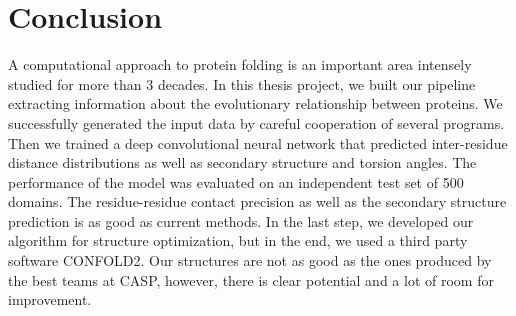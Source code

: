 \chapter*{Conclusion}

A computational approach to protein folding is an important area intensely studied for more than 3 decades. In this thesis project, we built our pipeline extracting information about the evolutionary relationship between proteins. We successfully generated the input data by careful cooperation of several programs. Then we trained a deep convolutional neural network that predicted inter-residue distance distributions as well as secondary structure and torsion angles. The performance of the model was evaluated on an independent test set of 500 domains. The residue-residue contact precision as well as the secondary structure prediction is as good as current methods. In the last step, we developed our algorithm for structure optimization, but in the end, we used a third party software CONFOLD2. Our structures are not as good as the ones produced by the best teams at CASP, however, there is clear potential and a lot of room for improvement.